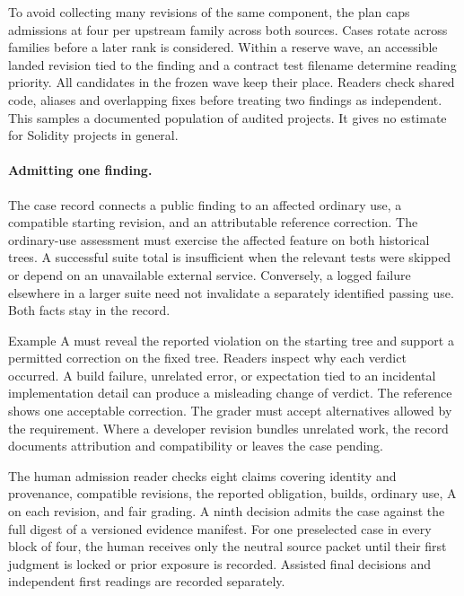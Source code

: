 To avoid collecting many revisions of the same component, the plan caps admissions at four per upstream family across both sources. Cases rotate across families before a later rank is considered. Within a reserve wave, an accessible landed revision tied to the finding and a contract test filename determine reading priority. All candidates in the frozen wave keep their place. Readers check shared code, aliases and overlapping fixes before treating two findings as independent. This samples a documented population of audited projects. It gives no estimate for Solidity projects in general.

\paragraph{Admitting one finding.}
The case record connects a public finding to an affected ordinary use, a compatible starting revision, and an attributable reference correction. The ordinary-use assessment must exercise the affected feature on both historical trees. A successful suite total is insufficient when the relevant tests were skipped or depend on an unavailable external service. Conversely, a logged failure elsewhere in a larger suite need not invalidate a separately identified passing use. Both facts stay in the record.

Example A must reveal the reported violation on the starting tree and support a permitted correction on the fixed tree. Readers inspect why each verdict occurred. A build failure, unrelated error, or expectation tied to an incidental implementation detail can produce a misleading change of verdict. The reference shows one acceptable correction. The grader must accept alternatives allowed by the requirement. Where a developer revision bundles unrelated work, the record documents attribution and compatibility or leaves the case pending.

The human admission reader checks eight claims covering identity and provenance, compatible revisions, the reported obligation, builds, ordinary use, A on each revision, and fair grading. A ninth decision admits the case against the full digest of a versioned evidence manifest. For one preselected case in every block of four, the human receives only the neutral source packet until their first judgment is locked or prior exposure is recorded. Assisted final decisions and independent first readings are recorded separately.

